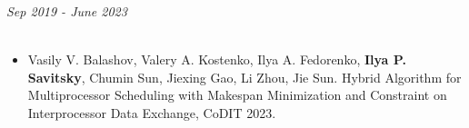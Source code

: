 \documentclass{resume} %
\begin{document}

\begin{rSection}{}

{\bf {} } \hfill {\em Sep 2019 - June 2023} \\
{\bf {}}
\\{ \textit { }}

\end{rSection}

\begin{rSection}{}
\begin{itemize}
\item Vasily V. Balashov, Valery A. Kostenko, Ilya A. Fedorenko, \textbf{Ilya P. Savitsky}, Chumin Sun, Jiexing Gao, Li Zhou, Jie Sun. Hybrid Algorithm for Multiprocessor Scheduling with Makespan Minimization and Constraint on Interprocessor Data Exchange, CoDIT 2023. 
\end{itemize}
\end{rSection}
\end{document}
